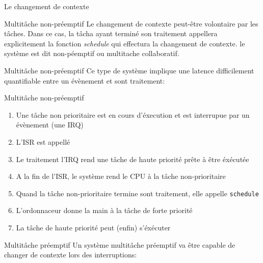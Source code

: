 \begin{frame}{Le changement de contexte}
  \begin{center}
  \end{center}
\end{frame}

\begin{frame}{Multitâche non-préemptif}
  Le changement de contexte  peut-être volontaire par les tâches. Dans
  ce   cas,  la   tâcha   ayant  terminé   son  traitement   appellera
  explicitement   la  fonction   \emph{schedule}   qui  effectura   la
  changement  de   contexte.  le  système  est   dit  non-péemptif  ou
  multitache collaboratif.
\end{frame}

\begin{frame}{Multitâche non-préemptif}
  Ce type  de système implique une  latence difficilement quantifiable
  entre un évènement et sont traitement:
  \begin{center}
  \end{center}
\end{frame}

\begin{frame}{Multitâche non-préemptif}
  \begin{enumerate} 
  \item  Une tâche  non prioritaire  est en  cours d'éxecution  et est
    interrupue par un évènement (une IRQ)
  \item L'ISR est appellé
  \item Le traitement  l'IRQ rend une tâche de  haute priorité prête à
    être éxécutée
  \item  A  la fin  de  l'ISR,  le système  rend  le  CPU  à la  tâche
    non-prioritaire
  \item Quand  la tâche non-prioritaire termine  sont traitement, elle
    appelle \texttt{schedule}
  \item L'ordonnaceur donne la main à la tâche de forte priorité
  \item La tâche de haute priorité peut (enfin) s'éxécuter
  \end{enumerate} 
\end{frame} 

\begin{frame}{Multitâche préemptif}
  Un  système  multitâche préemptif  va  être  capable  de changer  de
  contexte lors des interruptions:
  \begin{center}
  \end{center}
\end{frame}

